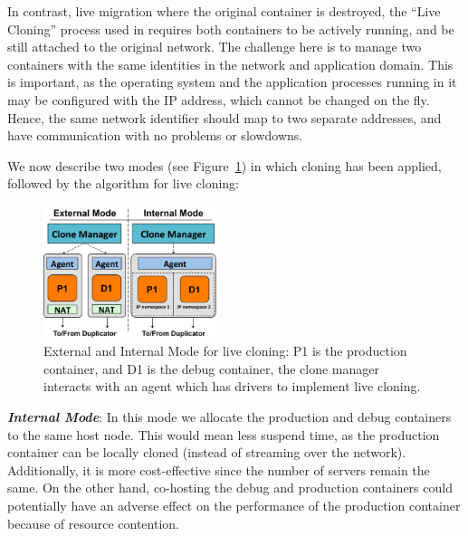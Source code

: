 In contrast, live migration where the original container is destroyed, the ``Live Cloning'' process used in \parikshan requires both containers to be actively running, and be still attached to the original network.
The challenge here is to manage two containers with the same identities in the network and application domain. 
This is important, as the operating system and the application processes running in it may be configured with the IP address, which cannot be changed on the fly.
Hence, the same network identifier should map to two separate addresses, and have communication with no problems or slowdowns.

We now describe two modes (see Figure~\ref{fig:modesCloning}) in which cloning has been applied, followed by the algorithm for live cloning:

\begin{figure}[t]
  \begin{center}
    \includegraphics[width=0.45\textwidth]{figs/ModesCloning.pdf}
    \caption{External and Internal Mode for live cloning: P1 is the production container, and D1 is the debug container, the clone manager interacts with an agent which has drivers to implement live cloning.}
    \label{fig:modesCloning}
  \end{center}
\end{figure}


\noindent
\textbf{\textit{Internal Mode}}: In this mode we allocate the production and debug containers to the same host node. 
This would mean less suspend time, as the production container can be locally cloned (instead of streaming over the network). 
Additionally, it is more cost-effective since the number of servers remain the same.
On the other hand, co-hosting the debug and production containers could potentially have an adverse effect on the performance of the production container because of resource contention.

